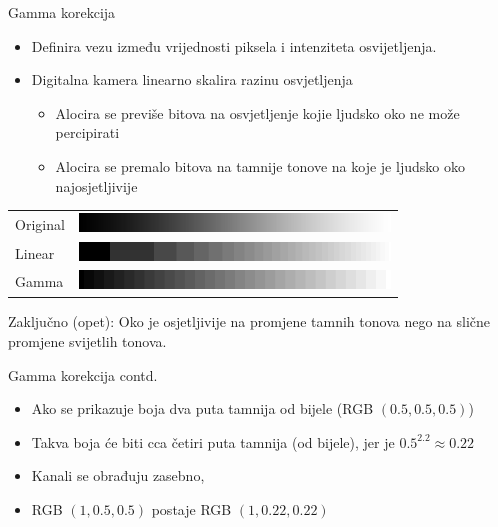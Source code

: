 \documentclass[9pt]{beamer}
\begin{document}
\begin{frame}{Gamma korekcija}
	\begin{itemize}
		\item Definira vezu između vrijednosti piksela i intenziteta osvijetljenja.
		\item Digitalna kamera linearno skalira razinu osvjetljenja
		\begin{itemize}
			\item Alocira se previše bitova na osvjetljenje kojie ljudsko oko ne može percipirati
			\item Alocira se premalo bitova na tamnije tonove na koje je ljudsko oko najosjetljivije
		\end{itemize}
	\end{itemize}
	
	\begin{tabular}{ll}
		Original &\includegraphics[height=0.5cm]{slike/05_gamma_gradient3b.png}\\
		Linear&  \includegraphics[height=0.5cm]{slike/05_gamma_gradient2b.png}\\
		Gamma&  \includegraphics[height=0.5cm]{slike/05_gamma_gradient1b.png}
	\end{tabular}
	Zaključno (opet): Oko je osjetljivije na promjene tamnih tonova nego na slične promjene svijetlih tonova.
	
\end{frame}
\begin{frame}{Gamma korekcija contd. }
	\begin{itemize}
		\item Ako se prikazuje boja dva puta tamnija od bijele (RGB $(0.5, 0.5, 0.5)$)
		\item Takva boja će biti cca četiri puta tamnija (od bijele), jer je $0.5^{2.2} \approx 0.22$
		\item Kanali se obrađuju zasebno,  
		\item RGB $(1, 0.5, 0.5)$ postaje RGB $(1, 0.22, 0.22)$
	\end{itemize}
\end{frame}
\end{document}
